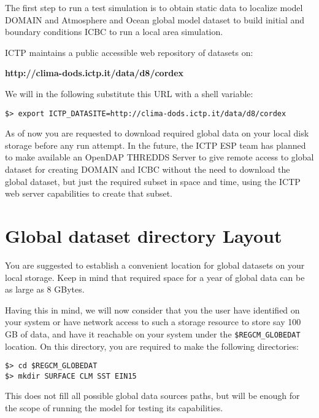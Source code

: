 %
%

The first step to run a test simulation is to obtain static data to localize
model DOMAIN and Atmosphere and Ocean global model dataset to build initial
and boundary conditions ICBC to run a local area simulation.

ICTP maintains a public accessible web repository of datasets on:

{\bf http://clima-dods.ictp.it/data/d8/cordex }

We will in the following substitute this URL with a shell variable:

\begin{Verbatim}
$> export ICTP_DATASITE=http://clima-dods.ictp.it/data/d8/cordex
\end{Verbatim}

As of now you are requested to download required global data on your local disk
storage before any run attempt. In the future, the ICTP ESP team has
planned to make available an OpenDAP THREDDS Server to give remote access
to global dataset for creating DOMAIN and ICBC without the need to
download the global dataset, but just the required subset in space and time,
using the ICTP web server capabilities to create that subset.

\section{Global dataset directory Layout}

You are suggested to establish a convenient location for global datasets
on your local storage. Keep in mind that required space for a year of global
data can be as large as 8 GBytes.

Having this in mind, we will now consider that you the user have identified
on your system or have network access to such a storage resource to store say
100 GB of data, and have it reachable on your system under the
\verb=$REGCM_GLOBEDAT= location.
On this directory, you are required to make the following directories:

\begin{Verbatim}
$> cd $REGCM_GLOBEDAT
$> mkdir SURFACE CLM SST EIN15
\end{Verbatim}

This does not fill all possible global data sources paths, but will be enough
for the scope of running the model for testing its capabilities.

